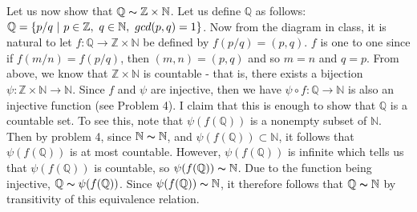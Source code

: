 \documentclass[12pt]{article}
\begin{document}
\noindent Let us now show that $\mathbb{Q} \thicksim \mathbb{Z} \times \mathbb{N}  $. Let us define $\mathbb{Q}$ as follows: \\ $\mathbb{Q} = \left\{p/q~|~p \in \mathbb{Z},~ q \in \mathbb{N},~gcd(p,q)=1\right\}$. Now from the diagram in class, it is natural to let $f:\mathbb{Q} \rightarrow \mathbb{Z} \times \mathbb{N}$ be defined by $f(p/q)= (p,q)$. $f$ is one to one since if $f(m/n)=f(p/q)$, then $(m,n)=(p,q)$ and so $m=n$ and $q=p$. From above, we know that $ \mathbb{Z} \times \mathbb{N}$ is countable - that is, there exists a bijection $\psi: \mathbb{Z} \times \mathbb{N} \rightarrow \mathbb{N}$. Since $f$ and $\psi$ are injective, then we have $\psi \circ f: \mathbb{Q} \rightarrow \mathbb{N}$ is also an injective function (see Problem 4). I claim that this is enough to show that $\mathbb{Q}$ is a countable set. To see this, note that $\psi(f(\mathbb{Q}))$ is a nonempty subset of $\mathbb{N}$. Then by problem 4, since $\mathbb{N} \thicksim \mathbb{N}$, and $ \psi(f(\mathbb{Q})) \subset \mathbb{N}$, it follows that $\psi(f(\mathbb{Q}))$ is at most countable. However, $\psi(f(\mathbb{Q}))$ is infinite which tells us that $\psi(f(\mathbb{Q}))$ is countable, so $\psi(f(\mathbb{Q})) \thicksim \mathbb{N}$. Due to the function being injective, $\mathbb{Q} \thicksim \psi(f(\mathbb{Q}))$. Since  $\psi(f(\mathbb{Q})) \thicksim \mathbb{N}$, it therefore follows that $\mathbb{Q} \thicksim \mathbb{N}$ by transitivity of this equivalence relation.  \\ \\
\end{document}
